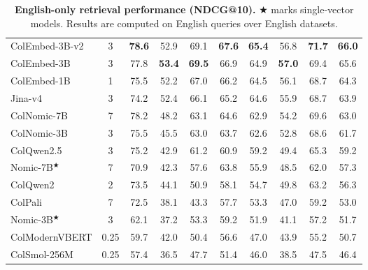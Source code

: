 \begin{table}[htbp]
\begin{tabular}{l c c c c c c c c >{\columncolor{avgcol}}c}
ColEmbed-3B-v2 & 3 & \textbf{78.6} & 52.9 & 69.1 & \textbf{67.6} & \textbf{65.4} & 56.8 & \textbf{71.7} & \textbf{66.0} \\
ColEmbed-3B & 3 & 77.8 & \textbf{53.4} & \textbf{69.5 }& 66.9 & 64.9 & \textbf{57.0} & 69.4 & 65.6 \\
ColEmbed-1B & 1 & 75.5 & 52.2 & 67.0 & 66.2 & 64.5 & 56.1 & 68.7 & 64.3 \\
Jina-v4 & 3 & 74.2 & 52.4 & 66.1 & 65.2 & 64.6 & 55.9 & 68.7 & 63.9 \\
ColNomic-7B & 7 & 78.2 & 48.2 & 63.1 & 64.6 & 62.9 & 54.2 & 69.6 & 63.0 \\
ColNomic-3B & 3 & 75.5 & 45.5 & 63.0 & 63.7 & 62.6 & 52.8 & 68.6 & 61.7 \\
ColQwen2.5 & 3 & 75.2 & 42.9 & 61.2 & 60.9 & 59.2 & 49.4 & 65.3 & 59.2 \\
Nomic-7B$^\bigstar$ & 7 & 70.9 & 42.3 & 57.6 & 63.8 & 55.9 & 48.5 & 62.0 & 57.3 \\
ColQwen2 & 2 & 73.5 & 44.1 & 50.9 & 58.1 & 54.7 & 49.8 & 63.2 & 56.3 \\
ColPali & 7 & 72.5 & 38.1 & 43.3 & 57.7 & 53.3 & 47.0 & 59.2 & 53.0 \\
Nomic-3B$^\bigstar$ & 3 & 62.1 & 37.2 & 53.3 & 59.2 & 51.9 & 41.1 & 57.2 & 51.7 \\
ColModernVBERT & 0.25 & 59.7 & 42.0 & 50.4 & 56.6 & 47.0 & 43.9 & 55.2 & 50.7 \\
ColSmol-256M & 0.25 & 57.4 & 36.5 & 47.7 & 51.4 & 46.0 & 38.5 & 47.5 & 46.4 \\
\bottomrule
\end{tabular}
\caption[English-only retrieval performance]{\textbf{English-only retrieval performance (NDCG@10).} $\bigstar$ marks single-vector models. Results are computed on English queries over English datasets.}
\label{vidorev3:tab: english-only retrieval}
\end{table}


